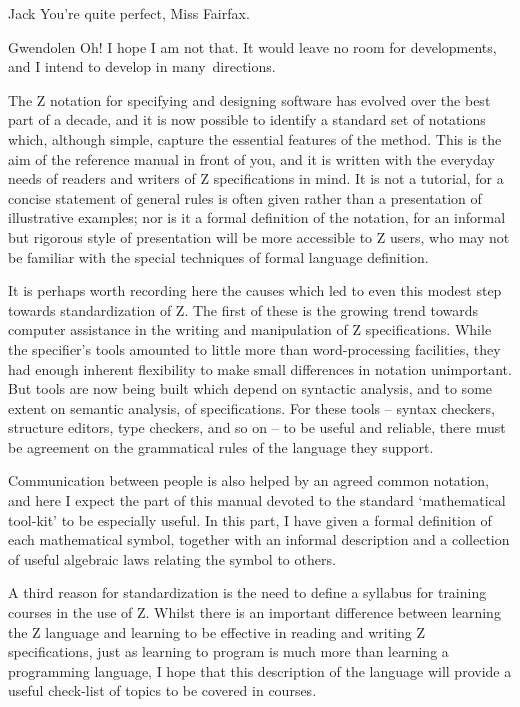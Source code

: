 \begin{thema}\begin{playlet}
\item[Jack] You're quite perfect, Miss Fairfax.
\item[Gwendolen] Oh! I hope I am not that. It would leave no room
	for developments, and I intend to develop in many~directions.
\end{playlet}\end{thema}

\noindent
The Z notation for specifying and designing software has evolved
over the best part of a decade, and it is now possible to identify
a standard set of notations which, although simple, capture the
essential features of the method. This is the aim of the reference
manual in front of you, and it is written with the everyday needs
of readers and writers of Z specifications in mind. It is not
a tutorial, for a concise statement of general rules
is often given rather than a presentation of illustrative examples;
nor is it a formal definition of the notation, for an informal
but rigorous style of presentation will be more accessible to
Z users, who may not be familiar with the special techniques of
formal language definition.

It is perhaps worth recording here the causes which led to even this
modest step towards standardization of Z. The first of these is the
growing trend towards computer assistance in the writing and
manipulation of Z specifications. While the specifier's tools
amounted to little more than word-processing facilities, they had
enough inherent flexibility to make small differences in notation
unimportant. But tools are now being built which depend on syntactic
analysis, and to some extent on semantic analysis, of specifications.
For these tools -- syntax checkers, structure editors, type checkers,
and so on -- to be useful and reliable, there must be agreement on
the grammatical rules of the language they support.

Communication between people is also helped by an agreed common
notation, and here I expect the part of this manual devoted to
the standard `mathematical tool-kit' to be especially useful. In
this part, I have given a formal definition of each mathematical
symbol, together with an informal description and a collection
of useful algebraic laws relating the symbol to others.

A third reason for standardization is the need to define a syllabus
for training courses in the use of Z.  Whilst
there is an important difference between learning the Z language and
learning to be effective in reading and writing Z specifications, just
as learning to program is much more than learning a programming
language, I hope that this description of the language will provide a
useful check-list of topics to be covered in courses.

